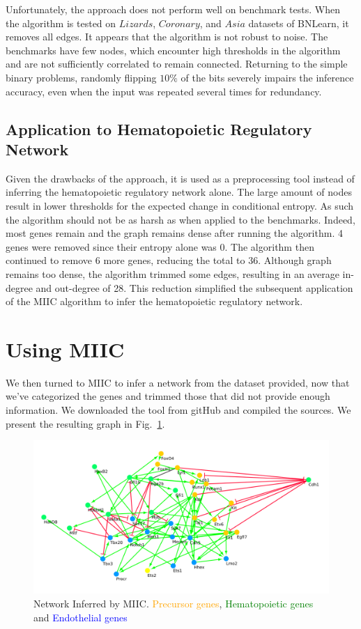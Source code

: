 \documentclass[a4paper,12pt]{book}
\theoremstyle{break}
\begin{document}
 Unfortunately, the approach does not perform well on benchmark tests. When the algorithm is tested on $Lizards$, $Coronary$, and $Asia$ datasets of BNLearn, it removes all edges. It appears that the algorithm is not robust to noise. The benchmarks have few nodes, which encounter high thresholds in the algorithm and are not sufficiently correlated to remain connected. Returning to the simple binary problems, randomly flipping $10\%$ of the bits severely impairs the inference accuracy, even when the input was repeated several times for redundancy. 
 \\
 
 \subsection*{Application to Hematopoietic Regulatory Network}
 Given the drawbacks of the approach, it is used as a preprocessing tool instead of inferring the hematopoietic regulatory network alone. The large amount of nodes result in lower thresholds for the expected change in conditional entropy. As such the algorithm should not be as harsh as when applied to the benchmarks. Indeed, most genes remain and the graph remains dense after running the algorithm. 4 genes were removed since their entropy alone was 0. The algorithm then continued to remove 6 more genes, reducing the total to 36. Although graph remains too dense, the algorithm trimmed some edges, resulting in an average in-degree and out-degree of 28. This reduction simplified the subsequent application of the MIIC algorithm to infer the hematopoietic regulatory network.
 
\section*{Using MIIC}
	We then turned to MIIC to infer a network from the dataset provided, now that we've categorized the genes and trimmed those that did not provide enough information. We downloaded the tool from gitHub and compiled the sources. We present the resulting graph in Fig.~\ref{fig:miicnetwork}.
	\begin{figure}[h!]
		\centering
		\includegraphics[width =\linewidth]{../Datasets/miic-trimmed/miic-trimmed.png}
		\caption{Network Inferred by MIIC. \textcolor{orange}{Precursor genes}, \textcolor{green}{ Hematopoietic genes} and  \textcolor{blue}{Endothelial genes}}
		\label{fig:miicnetwork}
	\end{figure}
\end{document}
